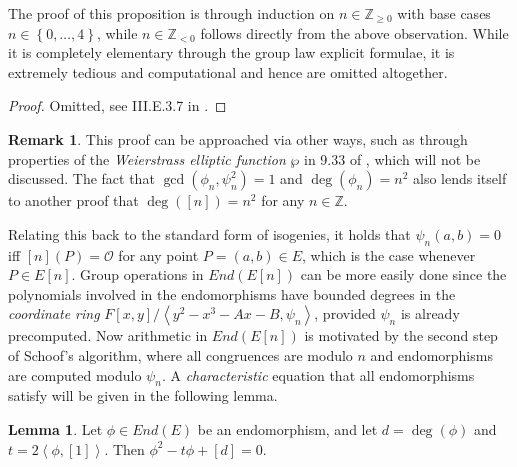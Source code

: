 \documentclass{article}
\newcommand{\Z}{\mathbb{Z}}
\newcommand{\rb}[1]{\left( #1 \right)}
\renewcommand{\sb}[1]{\left[ #1 \right]}
\newcommand{\cb}[1]{\left\{ #1 \right\}}
\newcommand{\ab}[1]{\left\langle #1 \right\rangle}
\theoremstyle{definition}
\newtheorem*{remark}{Remark}
\newtheorem{lemma}[proposition]{Lemma}
\begin{document}
The proof of this proposition is through induction on $ n \in \Z_{\ge 0} $ with base cases $ n \in \cb{0, \dots, 4} $, while $ n \in \Z_{< 0} $ follows directly from the above observation. While it is completely elementary through the group law explicit formulae, it is extremely tedious and computational and hence are omitted altogether.

\begin{proof}
Omitted, see III.E.3.7 in \cite{gtm}.
\end{proof}

\begin{remark}
This proof can be approached via other ways, such as through properties of the \emph{Weierstrass elliptic function} $ \wp $ in 9.33 of \cite{crypto}, which will not be discussed. The fact that $ \gcd\rb{\phi_n, \psi_n^2} = 1 $ and $ \deg\rb{\phi_n} = n^2 $ also lends itself to another proof that $ \deg\rb{\sb{n}} = n^2 $ for any $ n \in \Z $.
\end{remark}

Relating this back to the standard form of isogenies, it holds that $ \psi_n\rb{a, b} = 0 $ iff $ \sb{n}\rb{P} = \mathcal{O} $ for any point $ P = \rb{a, b} \in E $, which is the case whenever $ P \in E\sb{n} $. Group operations in $ End\rb{E\sb{n}} $ can be more easily done since the polynomials involved in the endomorphisms have bounded degrees in the \emph{coordinate ring} $ F\sb{x, y} / \ab{y^2 - x^3 - Ax - B, \psi_n} $, provided $ \psi_n $ is already precomputed. Now arithmetic in $ End\rb{E\sb{n}} $ is motivated by the second step of Schoof's algorithm, where all congruences are modulo $ n $ and endomorphisms are computed modulo $ \psi_n $. A \emph{characteristic} equation that all endomorphisms satisfy will be given in the following lemma.

\begin{lemma}
Let $ \phi \in End\rb{E} $ be an endomorphism, and let $ d = \deg\rb{\phi} $ and $ t = 2\ab{\phi, \sb{1}} $. Then $ \phi^2 - t\phi + \sb{d} = 0 $.
\end{lemma}
\end{document}
